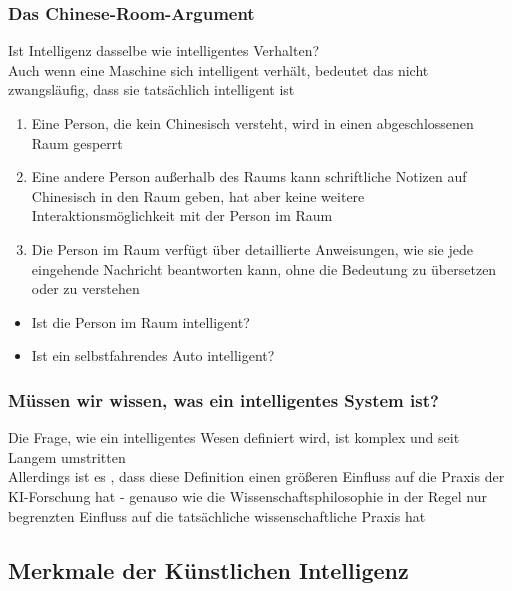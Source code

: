 \subsubsection*{Das Chinese-Room-Argument}
 Ist Intelligenz dasselbe wie intelligentes Verhalten?\\
 Auch wenn eine Maschine sich intelligent verhält, bedeutet das nicht zwangsläufig, dass sie tatsächlich intelligent ist\\
\begin{enumerate}
    \item Eine Person, die kein Chinesisch versteht, wird in einen abgeschlossenen Raum gesperrt
    \item Eine andere Person außerhalb des Raums kann schriftliche Notizen auf Chinesisch in den Raum geben, hat aber keine weitere Interaktionsmöglichkeit mit der Person im Raum
    \item Die Person im Raum verfügt über detaillierte Anweisungen, wie sie jede eingehende Nachricht beantworten kann, ohne die Bedeutung zu übersetzen oder zu verstehen
\end{enumerate}
\begin{itemize}
    \item Ist die Person im Raum intelligent?
    \item Ist ein selbstfahrendes Auto intelligent?
\end{itemize}
\subsubsection*{Müssen wir wissen, was ein intelligentes System ist?}
Die Frage, wie ein intelligentes Wesen definiert wird, ist komplex und seit Langem umstritten\\
Allerdings ist es , dass diese Definition einen größeren Einfluss auf die Praxis der KI-Forschung hat - genauso wie die Wissenschaftsphilosophie in der Regel nur begrenzten Einfluss auf die tatsächliche wissenschaftliche Praxis hat
\subsection{Merkmale der Künstlichen Intelligenz}
